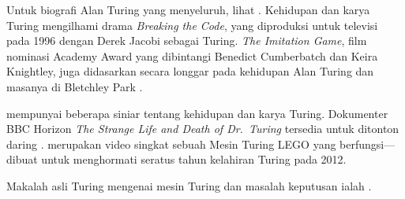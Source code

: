 \documentclass[../../../include/open-logic-section]{subfiles}
\begin{document}
\begin{reading}
Untuk biografi Alan Turing yang menyeluruh, lihat \citet{Hodges2014}.
Kehidupan dan karya Turing mengilhami drama \emph{Breaking the Code}, yang
diproduksi untuk televisi pada 1996 dengan Derek Jacobi sebagai Turing.
\emph{The Imitation Game}, film nominasi Academy Award yang dibintangi
Benedict Cumberbatch dan Keira Knightley, juga didasarkan secara longgar pada
kehidupan Alan Turing dan masanya di Bletchley Park
\citep{Imitation2014}.

\citet{Radiolab2012} mempunyai beberapa siniar tentang kehidupan dan karya
Turing. Dokumenter BBC Horizon \emph{The Strange Life and Death of
  Dr.~Turing} tersedia untuk ditonton daring \citep{Sykes1992}.
\citep{Theelen2012} merupakan video singkat sebuah Mesin Turing LEGO yang
berfungsi---dibuat untuk menghormati seratus tahun kelahiran Turing pada
2012.

Makalah asli Turing mengenai mesin Turing dan masalah keputusan ialah
\citet{Turing1937}.
\end{reading}
\end{document}

